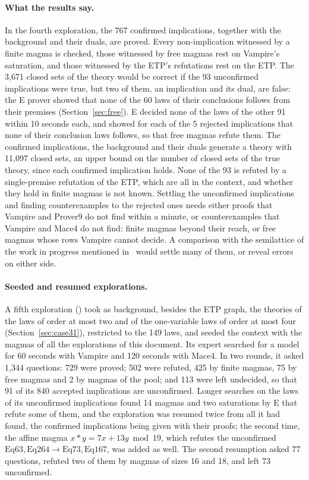 \documentclass[11pt,a4paper]{article}
\theoremstyle{definition}
\theoremstyle{remark}
\newcommand{\Eq}[1]{\mathrm{Eq}#1}
\begin{document}
\paragraph{What the results say.}
In the fourth exploration, the 767 confirmed implications, together with the background and their duals, are proved. Every non-implication witnessed by a finite magma is checked, those witnessed by free magmas rest on Vampire's saturation, and those witnessed by the ETP's refutations rest on the ETP. The 3,671 closed sets of the theory would be correct if the 93 unconfirmed implications were true, but two of them, an implication and its dual, are false: the E prover showed that none of the 60 laws of their conclusions follows from their premises (Section~\ref{sec:free}). E decided none of the laws of the other 91 within 10 seconds each, and showed for each of the 5 rejected implications that none of their conclusion laws follows, so that free magmas refute them. The confirmed implications, the background and their duals generate a theory with 11,097 closed sets, an upper bound on the number of closed sets of the true theory, since each confirmed implication holds. None of the 93 is refuted by a single-premise refutation of the ETP, which are all in the context, and whether they hold in finite magmas is not known. Settling the unconfirmed implications and finding counterexamples to the rejected ones needs either proofs that Vampire and Prover9 do not find within a minute, or counterexamples that Vampire and Mace4 do not find: finite magmas beyond their reach, or free magmas whose rows Vampire cannot decide. A comparison with the semilattice of the work in progress mentioned in~\cite{LF26b} would settle many of them, or reveal errors on either side.

\paragraph{Seeded and resumed explorations.}
A fifth exploration () took as background, besides the ETP graph, the theories of the laws of order at most two and of the one-variable laws of order at most four (Section~\ref{sec:case31}), restricted to the 149 laws, and seeded the context with the magmas of all the explorations of this document. Its expert searched for a model for 60 seconds with Vampire and 120 seconds with Mace4. In two rounds, it asked 1,344 questions: 729 were proved; 502 were refuted, 425 by finite magmas, 75 by free magmas and 2 by magmas of the pool; and 113 were left undecided, so that 91 of its 840 accepted implications are unconfirmed. Longer searches on the laws of its unconfirmed implications found 14 magmas and two saturations by E that refute some of them, and the exploration was resumed twice from all it had found, the confirmed implications being given with their proofs; the second time, the affine magma $x * y = 7x + 13y \bmod 19$, which refutes the unconfirmed $\Eq{63}, \Eq{264} \to \Eq{73}, \Eq{167}$, was added as well. The second resumption asked 77 questions, refuted two of them by magmas of sizes 16 and 18, and left 73 unconfirmed.
\end{document}

